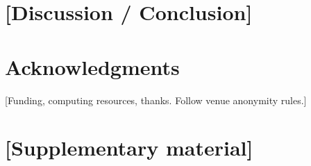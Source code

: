 \documentclass[11pt]{article}
\begin{document}
\section{[Discussion / Conclusion]}
\label{sec:conclusion}

\section*{Acknowledgments}
[Funding, computing resources, thanks. Follow venue anonymity rules.]



\appendix
\section{[Supplementary material]}
\end{document}
